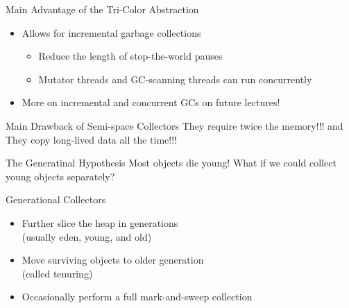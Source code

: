 \documentclass[
14pt,
aspectratio=169,
usenames,
dvipsnames,
x11names]{beamer}
\begin{document}
\begin{frame}{Main Advantage of the Tri-Color Abstraction}
  \begin{itemize}  \setlength{\itemsep}{\fill}
  \item Allows for incremental garbage collections
    \begin{itemize}
    \item Reduce the length of stop-the-world pauses
    \item Mutator threads and GC-scanning threads can run concurrently
    \end{itemize}
  \item More on incremental and concurrent GCs on future lectures!
  \end{itemize}
\end{frame}

\begin{frame}{Main Drawback of Semi-space Collectors}
  \centering
  They require \alert{twice} the memory!!!
  \vfill
  \pause
  and
  \vfill
  They copy \alert{long-lived} data all the time!!!
\end{frame}

\begin{frame}{The Generatinal Hypothesis}
  \centering
  Most objects \alert{die young}!
  \vfill
  \pause
  What if we could collect young objects \alert{separately}?
\end{frame}

\begin{frame}{Generational Collectors}
  \begin{itemize}  \setlength{\itemsep}{\fill}
  \item Further slice the heap in \alert{generations}\\ (usually eden, young, and old)
  \item Move \alert{surviving} objects to older generation\\
    (called tenuring)
  \item Occasionally perform a \alert{full mark-and-sweep} collection
  \end{itemize}
\end{frame}
\end{document}
